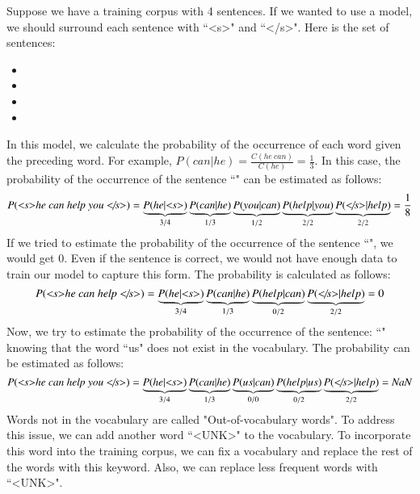 \documentclass{KBook}
\begin{document}
Suppose we have a training corpus with 4 sentences.
If we wanted to use a  model, we should surround each sentence with ``\textless s\textgreater" and ``\textless/s\textgreater".
Here is the set of sentences:
\begin{itemize}
	\item {}
	\item {}
	\item {}
	\item {}
\end{itemize}
%
In this model, we calculate the probability of the occurrence of each word given the preceding word.
For example, $P(can | he) = \frac{C(he\ can)}{C(he)} = \frac{1}{3}$.
In this case, the probability of the occurrence of the sentence ``" can be estimated as follows:
\[
P(\text{\textit{\textless s\textgreater he can help you \textless/s\textgreater}}) = 
\underbrace{P(he|\text{\textit{\textless s\textgreater}})}_{3/4}
\underbrace{P(can|he)}_{1/3} 
\underbrace{P(you|can)}_{1/2} 
\underbrace{P(help|you)}_{2/2}
\underbrace{P(\text{\textit{\textless/s\textgreater}}|help)}_{2/2} = 
\frac{1}{8}
\]
%
If we tried to estimate the probability of the occurrence of the sentence ``", we would get $0$.
Even if the sentence is correct, we would not have enough data to train our model to capture this form.
The probability is calculated as follows:
\[
P(\text{\textit{\textless s\textgreater he can help \textless/s\textgreater}}) = 
\underbrace{P(he|\text{\textit{\textless s\textgreater}})}_{3/4}
\underbrace{P(can|he)}_{1/3} 
\underbrace{P(help|can)}_{0/2}
\underbrace{P(\text{\textit{\textless/s\textgreater}}|help)}_{2/2} = 
0
\]
%
Now, we try to estimate the probability of the occurrence of the sentence: 
``" knowing that the word ``us" does not exist in the vocabulary.
The probability can be estimated as follows:
\[
P(\text{\textit{\textless s\textgreater he can help you \textless/s\textgreater}}) = 
\underbrace{P(he|\text{\textit{\textless s\textgreater}})}_{3/4}
\underbrace{P(can|he)}_{1/3} 
\underbrace{P(us|can)}_{0/0} 
\underbrace{P(help|us)}_{0/2}
\underbrace{P(\text{\textit{\textless/s\textgreater}}|help)}_{2/2} = 
\text{\textit{NaN}}
\]
Words not in the vocabulary are called "Out-of-vocabulary words".
To address this issue, we can add another word ``\textless UNK\textgreater" to the vocabulary.
To incorporate this word into the training corpus, we can fix a vocabulary and replace the rest of the words with this keyword.
Also, we can replace less frequent words with ``\textless UNK\textgreater".
\end{document}
